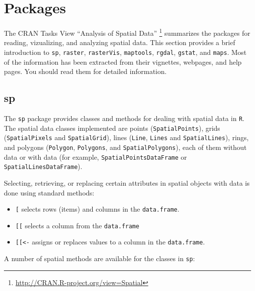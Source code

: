 \documentclass[smallroyalvopaper]{memoir}
\begin{document}
\section{Packages}
\label{sec:orgheadline31}
\label{sec:spatial-packages}

The CRAN Tasks View ``Analysis of Spatial Data'' \footnote{\url{http://CRAN.R-project.org/view=Spatial}} summarizes the packages for reading, vizualizing, and analyzing spatial data. This section provides a brief introduction to \texttt{sp}, \texttt{raster}, \texttt{rasterVis}, \texttt{maptools}, \texttt{rgdal}, \texttt{gstat}, and \texttt{maps}. Most of the information has been extracted from their vignettes, webpages, and help pages. You should read them for detailed information.

\subsection{sp}
\label{sec:orgheadline24}
\label{sec:sp}


The \texttt{sp} package \cite{Pebesma.Bivand2005} provides classes and methods for dealing with spatial data in \texttt{R}. The spatial data classes implemented are points (\texttt{SpatialPoints}), grids (\texttt{SpatialPixels} and \texttt{SpatialGrid}), lines (\texttt{Line}, \texttt{Lines} and \texttt{SpatialLines}), rings, and polygons (\texttt{Polygon}, \texttt{Polygons}, and \texttt{SpatialPolygons}), each of them without data or with data (for example, \texttt{SpatialPointsDataFrame} or \texttt{SpatialLinesDataFrame}).

Selecting, retrieving, or replacing certain attributes in spatial objects with data is done using standard methods:

\begin{itemize}
\item \texttt{[} selects rows (items) and columns in the \texttt{data.frame}.

\item \texttt{[[} selects a column from the \texttt{data.frame}

\item \texttt{[[<-} assigns or replaces values to a column in the \texttt{data.frame}.
\end{itemize}

A number of spatial methods are available for the classes in \texttt{sp}:
\end{document}
